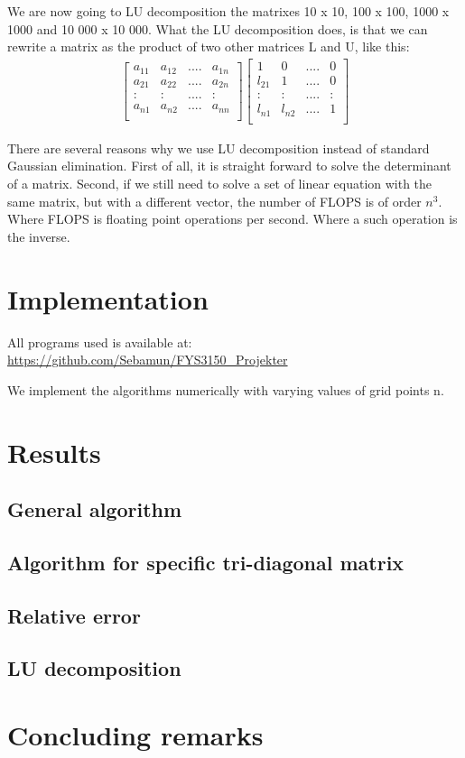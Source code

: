 \documentclass[norsk,a4paper,12pt]{article}
\begin{document}
We are now going to LU decomposition the matrixes 10 x 10, 100 x 100, 1000 x 1000 and 10 000 x 10 000. What the LU decomposition does, is that we can rewrite a matrix as the product of two other matrices L and U, like this:
\begin{align*}
\begin{bmatrix}
a_{11} & a_{12} & .... & a_{1n} \\
a_{21} & a_{22} & .... & a_{2n} \\
: & :& .... & : \\
a_{n1} & a_{n2} & .... & a_{nn} \\
\end{bmatrix}
\begin{bmatrix}
1 & 0 & .... & 0 \\
l_{21} & 1 & .... & 0 \\
: & :& .... & : \\
l_{n1} & l_{n2} & .... & 1\\
\end{bmatrix}
\end{align*}





There are several reasons why we use LU decomposition instead of standard Gaussian elimination. First of all, it is straight forward to solve the determinant of a matrix. Second, if we still need to solve a set of linear equation with the same matrix, but with a different vector, the number of FLOPS is of order $n^3$. Where FLOPS is floating point operations per second. Where a such operation is the inverse. 




\section{Implementation}

All programs used is available at: \\
\url{https://github.com/Sebamun/FYS3150_Projekter}

We implement the algorithms numerically with varying values of grid points n. 

\section{Results}

\subsection{General algorithm}

\subsection{Algorithm for specific tri-diagonal matrix}

 \subsection{Relative error}
 
  \subsection{LU decomposition}

\section{Concluding remarks}


\end{document}
